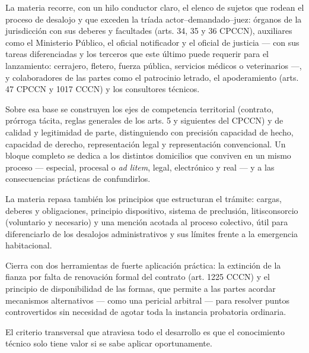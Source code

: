 \documentclass[12pt,oneside]{book}
\begin{document}
La materia recorre, con un hilo conductor claro, el elenco de sujetos que rodean el proceso de desalojo y que exceden la tríada actor--demandado--juez: órganos de la jurisdicción con sus deberes y facultades (arts. 34, 35 y 36 CPCCN), auxiliares como el Ministerio Público, el oficial notificador y el oficial de justicia --- con sus tareas diferenciadas y los terceros que este último puede requerir para el lanzamiento: cerrajero, fletero, fuerza pública, servicios médicos o veterinarios ---, y colaboradores de las partes como el patrocinio letrado, el apoderamiento (arts. 47 CPCCN y 1017 CCCN) y los consultores técnicos.

Sobre esa base se construyen los ejes de competencia territorial (contrato, prórroga tácita, reglas generales de los arts. 5 y siguientes del CPCCN) y de calidad y legitimidad de parte, distinguiendo con precisión capacidad de hecho, capacidad de derecho, representación legal y representación convencional. Un bloque completo se dedica a los distintos domicilios que conviven en un mismo proceso --- especial, procesal o \emph{ad litem}, legal, electrónico y real --- y a las consecuencias prácticas de confundirlos.

La materia repasa también los principios que estructuran el trámite: cargas, deberes y obligaciones, principio dispositivo, sistema de preclusión, litisconsorcio (voluntario y necesario) y una mención acotada al proceso colectivo, útil para diferenciarlo de los desalojos administrativos y sus límites frente a la emergencia habitacional.

Cierra con dos herramientas de fuerte aplicación práctica: la extinción de la fianza por falta de renovación formal del contrato (art. 1225 CCCN) y el principio de disponibilidad de las formas, que permite a las partes acordar mecanismos alternativos --- como una pericial arbitral --- para resolver puntos controvertidos sin necesidad de agotar toda la instancia probatoria ordinaria.

El criterio transversal que atraviesa todo el desarrollo es que el conocimiento técnico solo tiene valor si se sabe aplicar oportunamente.
\end{document}
